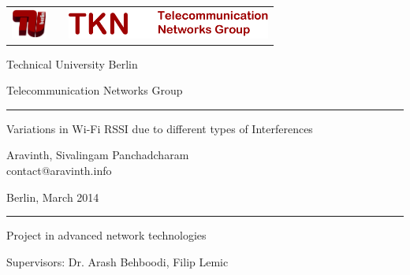 \documentclass[11pt,a4paper,headinclude,footinclude,chapterprefix=on]{scrreprt}
\makeatletter
\newcommand{\trnumber}{TKN-14}
\newcommand{\trdate}{March 2014}
\newcommand{\trauthor}{Aravinth, Sivalingam Panchadcharam}
\newcommand{\tremail}{contact@aravinth.info}
\newcommand{\trtitle}{Variations in Wi-Fi RSSI due to different types of Interferences}
\makeatother
\begin{document}


{ \sffamily

\thispagestyle{empty} 
\begin{tabularx}
	{\columnwidth}{cXc} 
	\includegraphics[height=1cm]{TU-Logo-3D-rot.pdf} & & 
	\includegraphics[height=1cm]{tknlogo.pdf} \\
\end{tabularx}

\vspace{1.0cm} 
\begin{center}
	{\huge 
	\noindent Technical University Berlin
	
	\vspace{0.5cm}
	
	\noindent Telecommunication Networks Group 
	\begin{center}
		\rule{15.5cm}{0.4pt} 
	\end{center}
	} 
\end{center}
\begin{minipage}
	[][11.0cm][c]{14.5cm} {\Huge 
	\begin{center}
		\trtitle 
	\end{center}
	\begin{center}
		\trauthor \\
		{\Large \tremail} 
	\end{center}
	\begin{center}
		Berlin, \trdate 
	\end{center}
	
	\vspace{0.5cm}
	
	}
	
\end{minipage}

\setlength{\fboxrule}{0.4pt} \setlength{\fboxsep}{0.4pt} 
\begin{center}
	
	\rule{15.5cm}{0.4pt}
	
	\vspace{0.5cm}
	
	{\huge {Project in advanced network technologies}}
	
	\vspace{0.5cm}
	
	{\huge Supervisors: Dr. Arash Behboodi, Filip Lemic}
	
	\vspace{0.5cm} 
\end{center}
}
\end{document}
